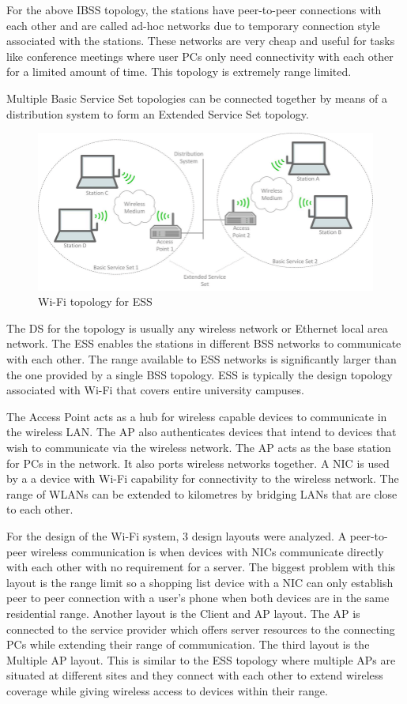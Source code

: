 For the above IBSS topology, the stations have peer-to-peer connections with each other and are called ad-hoc networks due to temporary connection style associated with the stations. These networks are very cheap and useful for tasks like conference meetings where user PCs only need connectivity with each other for a limited amount of time. This topology is extremely range limited. 

Multiple Basic Service Set topologies can be connected together by means of a distribution system to form an Extended Service Set topology. 
\begin{figure}[h]
	\centering
	\includegraphics[scale=0.5]{26}
	\caption{Wi-Fi topology for ESS}
\end{figure}

The DS for the topology is usually any wireless network or Ethernet local area  network. The ESS enables the stations in different BSS networks to communicate with each other. The range available to ESS networks is significantly larger than the one provided by a single BSS topology. ESS is typically the design topology associated with Wi-Fi that covers entire university campuses.

The Access Point acts as a hub for wireless capable devices to communicate in the wireless LAN. The AP also authenticates devices that intend to devices that wish to communicate via the wireless network. The AP acts as the base station for PCs in the network. It also ports wireless networks together. A NIC is used by a a device with Wi-Fi capability for connectivity to the wireless network. The range of WLANs can be extended to kilometres by bridging LANs that are close to each other.


For the design of the Wi-Fi system, 3 design layouts were analyzed. A peer-to-peer wireless communication is when devices with NICs communicate directly with each other with no requirement for a server. The biggest problem with this layout is the range limit so a shopping list device with a NIC can only establish peer to peer connection with a user's phone when both devices are in the same residential range. Another layout is the Client and AP layout. The AP is connected to the service provider which offers server resources to the connecting PCs while extending their range of communication. The third layout is the Multiple AP layout. This is similar to the ESS topology where multiple APs are situated at different sites and they connect with each other to extend wireless coverage while giving wireless access to devices within their range.

